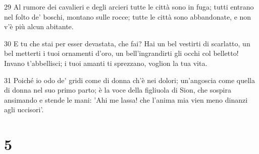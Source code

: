 \par 29 Al rumore dei cavalieri e degli arcieri tutte le città sono in fuga; tutti entrano nel folto de' boschi, montano sulle rocce; tutte le città sono abbandonate, e non v'è più alcun abitante.
\par 30 E tu che stai per esser devastata, che fai? Hai un bel vestirti di scarlatto, un bel metterti i tuoi ornamenti d'oro, un bell'ingrandirti gli occhi col belletto! Invano t'abbellisci; i tuoi amanti ti sprezzano, voglion la tua vita.
\par 31 Poiché io odo de' gridi come di donna ch'è nei dolori; un'angoscia come quella di donna nel suo primo parto; è la voce della figliuola di Sion, che sospira ansimando e stende le mani: 'Ahi me lassa! che l'anima mia vien meno dinanzi agli uccisori'.

\chapter{5}


